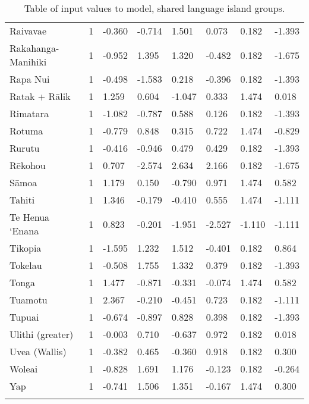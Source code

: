 \begin{longtable}{p{4.5cm}p{1.4cm}p{1.4cm}p{1.4cm}p{1.7cm}p{1.7cm}p{1.7cm}p{1.7cm}}
  Raivavae & 1 & -0.360 & -0.714 & 1.501 & 0.073 & 0.182 & -1.393 \\ 
  Rakahanga-Manihiki & 1 & -0.952 & 1.395 & 1.320 & -0.482 & 0.182 & -1.675 \\ 
  Rapa Nui & 1 & -0.498 & -1.583 & 0.218 & -0.396 & 0.182 & -1.393 \\ 
  Ratak + Rālik & 1 & 1.259 & 0.604 & -1.047 & 0.333 & 1.474 & 0.018 \\ 
  Rimatara & 1 & -1.082 & -0.787 & 0.588 & 0.126 & 0.182 & -1.393 \\ 
  Rotuma & 1 & -0.779 & 0.848 & 0.315 & 0.722 & 1.474 & -0.829 \\ 
  Rurutu & 1 & -0.416 & -0.946 & 0.479 & 0.429 & 0.182 & -1.393 \\ 
  Rēkohou & 1 & 0.707 & -2.574 & 2.634 & 2.166 & 0.182 & -1.675 \\ 
  Sāmoa & 1 & 1.179 & 0.150 & -0.790 & 0.971 & 1.474 & 0.582 \\ 
  Tahiti & 1 & 1.346 & -0.179 & -0.410 & 0.555 & 1.474 & -1.111 \\ 
  Te Henua ‘Enana & 1 & 0.823 & -0.201 & -1.951 & -2.527 & -1.110 & -1.111 \\ 
  Tikopia & 1 & -1.595 & 1.232 & 1.512 & -0.401 & 0.182 & 0.864 \\ 
  Tokelau & 1 & -0.508 & 1.755 & 1.332 & 0.379 & 0.182 & -1.393 \\ 
  Tonga & 1 & 1.477 & -0.871 & -0.331 & -0.074 & 1.474 & 0.582 \\ 
  Tuamotu & 1 & 2.367 & -0.210 & -0.451 & 0.723 & 0.182 & -1.111 \\ 
  Tupuai & 1 & -0.674 & -0.897 & 0.828 & 0.398 & 0.182 & -1.393 \\ 
  Ulithi (greater) & 1 & -0.003 & 0.710 & -0.637 & 0.972 & 0.182 & 0.018 \\ 
  Uvea (Wallis) & 1 & -0.382 & 0.465 & -0.360 & 0.918 & 0.182 & 0.300 \\ 
  Woleai & 1 & -0.828 & 1.691 & 1.176 & -0.123 & 0.182 & -0.264 \\ 
  Yap & 1 & -0.741 & 1.506 & 1.351 & -0.167 & 1.474 & 0.300 \\ 
   \bottomrule
\caption{Table of input values to model, shared language island groups.} 
\label{appendix_medium_table}
\end{longtable}
